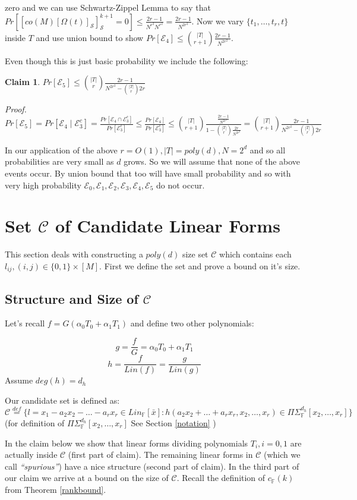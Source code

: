 \documentclass[letterpaper,USenglish,numberwithinsect]{lipics}
\newcommand{\eqdef}{\stackrel{def}{=}}
\newcommand{\F}{\mathbb{F}}
\newcommand{\ME}{\mathcal{E}}
\newcommand{\MS}{\mathcal{S}}
\newcommand{\MC}{\mathcal{C}}
\newcommand{\B}[1]{\bar{#1}}
\newtheorem{claim}[theorem]{Claim}
\begin{document}
zero and we can use Schwartz-Zippel Lemma to say that $Pr[[co(M)[\Omega(t)]_\MS]^{k+1}_\MS = 0] \leq \frac{2r-1}{N^{r^2}N^{r^2}} = \frac{2r-1}
{N^{2r^2}}$. Now we vary $\{t_1,\ldots,t_r,t\}$ inside $T$ and use union bound to show $Pr[\ME_4]\leq {|T|\choose r+1}\frac{2r-1}{N^{2r^2}}$.


Even though this is just basic probability we include the following:
\begin{claim}
 $Pr[\ME_5] \leq {|T|\choose r}\frac{2r-1}{N^{2r^2}-{|T|\choose r}2r}$
\end{claim}
\emph{Proof.}
 $Pr[\ME_5] = Pr[\ME_4\mid \ME_3^c] = \frac{Pr[\ME_4\cap \ME_3^c]}{Pr[\ME_3^c]} \leq \frac{Pr[\ME_4]}{Pr[\ME_3^c]}
 \leq {|T|\choose r+1}\frac{\frac{2r-1}{N^{2r^2}}}{1-{|T|\choose r}\frac{2r}{N^{2r^2}}}  = {|T|\choose r+1}\frac{2r-1}
 {N^{2r^2}-{|T|\choose r}2r}$



In our application of the above $r = O(1), |T| = poly(d), N = 2^{d}$ and so all probabilities are very small as $d$ grows. So we will
assume that none of the above events occur. By union bound that too will have small probability and so with very
high probability $\ME_0,\ME_1,\ME_2,\ME_3,\ME_4,\ME_5$ do not occur.
















\section{Set $\MC$ of Candidate Linear Forms}\label{findcandidate}
This section deals with constructing a $poly(d)$ size set $\MC$ which
contains each $l_{ij}, (i,j)\in \{0,1\}\times [M]$. First we define the
set and prove a bound on it's size.
\subsection{Structure and Size of $\MC$}
Let's recall $f=G(\alpha_0T_0 + \alpha_1 T_1)$ and define two other
polynomials:

\[
g=\frac{f}{G} = \alpha_0T_0+\alpha_1T_1
\]
\[
h =\frac{f}{Lin(f)} = \frac{g}{Lin(g)}
\]
Assume $deg(h) = d_h$
\begin{definition}\label{candidatedef}
Our candidate set is defined as:
\[
\MC \eqdef \{l = x_1-a_2x_2-\ldots- a_rx_r \in Lin_{\F}[\B{x}] :
h(a_2x_2+\ldots + a_rx_r,x_2,\ldots,x_r) \in \Pi\Sigma^{d_h}_\F[x_2,\ldots,x_r]
\}
\]
(for definition of $\Pi\Sigma^{d_h}_\F[x_2,\ldots,x_r]$ See Section \ref{notation} )

\end{definition}
In the claim below we show that linear forms dividing polynomials $T_i, i=0,1$
are actually inside $\MC$ (first part of claim). The remaining linear forms in
$\MC$ (which we call
\emph{``spurious''}) have a nice structure (second part of claim). In the third
part of our claim we arrive at a bound on the size of $\MC$. Recall the definition of $c_\F(k)$
from Theorem \ref{rankbound}.
\end{document}
